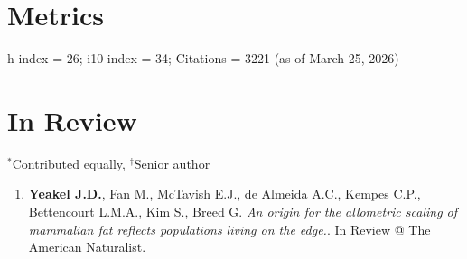 \documentclass[margin,line,12pt]{res}
\newcommand\reverselabel[1]{%
  \def\theenumi{}%
  \renewcommand\makelabel{\makebox[\dimexpr\labelwidth-3pt\relax][r]{%
    \the\numexpr#1-\value{enumi}+1\relax}}}%
\begin{document}
\begin{resume}
\begin{itemize}



\end{itemize}


\section{\sc Metrics}
h-index = 26; i10-index = 34; Citations = 3221 (as of March 25, 2026)







\section{\sc In Review}
{\footnotesize{${}^\ast$Contributed equally, ${}^\dag$Senior author}}
\begin{enumerate}
  \reverselabel{49}

\item \textbf{Yeakel J.D.}, Fan M., McTavish E.J., de Almeida A.C., Kempes C.P., Bettencourt L.M.A., Kim S., Breed G.  \emph{An origin for the allometric scaling of mammalian fat reflects populations living on the edge.}. In Review @ The American Naturalist.


\end{enumerate}
\end{resume}
\end{document}
